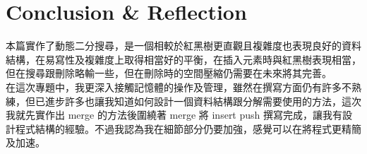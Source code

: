 \documentclass[12pt]{article}
\begin{document}
	\part{Conclusion \& Reflection}
		本篇實作了動態二分搜尋，是一個相較於紅黑樹更直觀且複雜度也表現良好的資料結構，在易寫性及複雜度上取得相當好的平衡，在插入元素時與紅黑樹表現相當，但在搜尋跟刪除略輸一些，但在刪除時的空間壓縮仍需要在未來將其完善。\\
		
		在這次專題中，我更深入接觸記憶體的操作及管理，雖然在撰寫方面仍有許多不熟練，但已進步許多也讓我知道如何設計一個資料結構跟分解需要使用的方法，這次我就先實作出 merge 的方法後圍繞著 merge 將 insert push 撰寫完成，讓我有設計程式結構的經驗。不過我認為我在細節部分仍要加強，感覺可以在將程式更精簡及加速。
\end{document}
